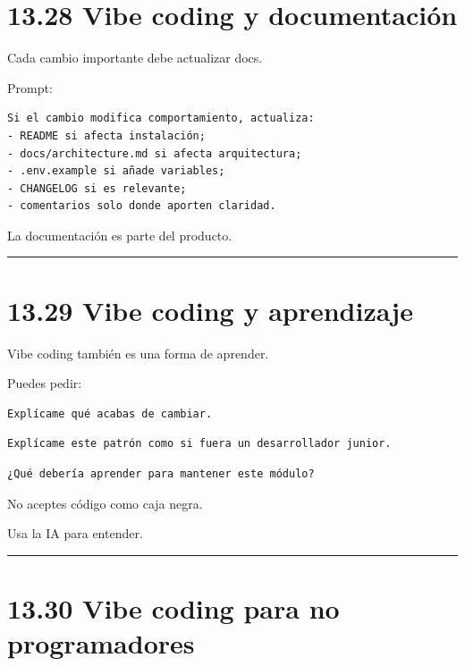 \section{13.28 Vibe coding y
documentación}\label{vibe-coding-y-documentaciuxf3n}

Cada cambio importante debe actualizar docs.

Prompt:

\begin{lstlisting}
Si el cambio modifica comportamiento, actualiza:
- README si afecta instalación;
- docs/architecture.md si afecta arquitectura;
- .env.example si añade variables;
- CHANGELOG si es relevante;
- comentarios solo donde aporten claridad.
\end{lstlisting}

La documentación es parte del producto.

\begin{center}\rule{0.5\linewidth}{0.5pt}\end{center}

\section{13.29 Vibe coding y
aprendizaje}\label{vibe-coding-y-aprendizaje}

Vibe coding también es una forma de aprender.

Puedes pedir:

\begin{lstlisting}
Explícame qué acabas de cambiar.
\end{lstlisting}

\begin{lstlisting}
Explícame este patrón como si fuera un desarrollador junior.
\end{lstlisting}

\begin{lstlisting}
¿Qué debería aprender para mantener este módulo?
\end{lstlisting}

No aceptes código como caja negra.

Usa la IA para entender.

\begin{center}\rule{0.5\linewidth}{0.5pt}\end{center}

\section{13.30 Vibe coding para no
programadores}\label{vibe-coding-para-no-programadores}

